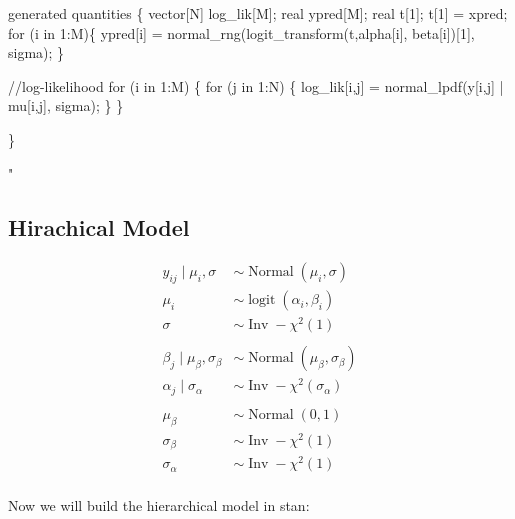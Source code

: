 \documentclass[
]{article}
\newenvironment{Shaded}{\begin{snugshade}}{\end{snugshade}}
\newcommand{\StringTok}[1]{\textcolor[rgb]{0.31,0.60,0.02}{#1}}
\begin{document}
\begin{Shaded}
\begin{Highlighting}[]
\StringTok{generated quantities \{}
\StringTok{  vector[N] log\_lik[M];}
\StringTok{  real ypred[M];}
\StringTok{  real t[1];}
\StringTok{  t[1] = xpred;}
\StringTok{  for (i in 1:M)\{}
\StringTok{    ypred[i] = normal\_rng(logit\_transform(t,alpha[i], beta[i])[1], sigma);}
\StringTok{  \}}

\StringTok{  //log{-}likelihood}
\StringTok{  for (i in 1:M) \{}
\StringTok{    for (j in 1:N) \{}
\StringTok{    log\_lik[i,j] = normal\_lpdf(y[i,j] | mu[i,j], sigma);}
\StringTok{    \}}
\StringTok{  \}}

\StringTok{\}}

\StringTok{"}
\end{Highlighting}
\end{Shaded}

\hypertarget{hirachical-model}{%
\subsection{Hirachical Model}\label{hirachical-model}}

\[
\begin{aligned}
y_{i j} \mid \mu_i, \sigma &\sim \operatorname{Normal}\left(\mu_i, \sigma\right) \\
\mu_i &\sim \operatorname{logit}(\alpha_i, \beta_i)\\
\sigma & \sim \operatorname{Inv}-\chi^{2}(1) \\
\\
\beta_{j}\mid \mu_{\beta}, \sigma_{\beta} &\sim \operatorname{Normal}(\mu_{\beta}, \sigma_{\beta})\\
\alpha_{j} \mid \sigma_{\alpha} & \sim \operatorname{Inv}-\chi^{2}\left(\sigma_{\alpha}\right) \\
\\
\mu_{\beta} & \sim \operatorname{Normal}(0,1)\\
\sigma_{\beta} & \sim \operatorname{Inv}-\chi^{2}(1) \\
\sigma_{\alpha} & \sim \operatorname{Inv}-\chi^{2}(1) \\
\end{aligned}
\]

Now we will build the hierarchical model in stan:
\end{document}
